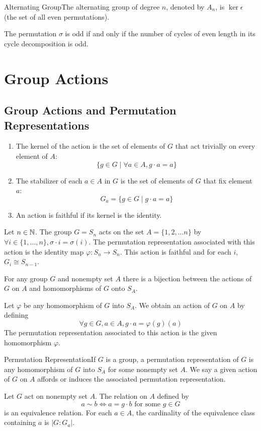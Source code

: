 \documentclass{report}
\newcommand{\mprop}[2]{\begin{Prop}{#1}{}#2\end{Prop}}
\newcommand{\ex}[2]{\begin{Example}{#1}{}#2\end{Example}}
\newcommand{\dfn}[2]{\begin{Definition}[colbacktitle=red!75!black]{#1}{}#2\end{Definition}}
\newenvironment{myproof}[1][\proofname]{%
	\proof[\bfseries #1: ]%
}{\endproof}
\newcommand{\eps}{\epsilon}
\begin{document}
\dfn{Alternating Group}{The alternating group of degree $n$, denoted by $A_n$, is $\ker \eps$ (the set of all even permutations).}
\mprop{}{The permutation $\sigma$ is odd if and only if the number of cycles of even length in its cycle decomposition is odd. }


\chapter{Group Actions}
\section{Group Actions and Permutation Representations}
\dfn{}{\begin{enumerate}
    \item The kernel of the action is the set of elements of $G$ that act trivially on every element of $A$: $$\{g \in G \mid \forall a \in A, g \cdot a = a\}$$
    \item The stabilizer of each $a \in A$ in $G$ is the set of elements of $G$ that fix element $a$:
    $$G_a = \{ g\in G \mid g \cdot a = a \}$$
    \item An action is faithful if its kernel is the identity. 
\end{enumerate}}
\ex{}{Let $n \in \mathbb{N}$. The group $G = S_n$ acts on the set $A = \{1, 2, \dots n\}$ by $\forall i \in \{1, \dots, n \}, \sigma \cdot i = \sigma (i)$. The permutation representation associated with this action is the identity map $\varphi : S_n \to S_n$. This action is faithful and for each $i$, $G_i \cong S_{n-1}$.}
\mprop{}{For any group $G$ and nonempty set $A$ there is a bijection between the actions of $G$ on $A$ and homomorphisms of $G$ onto $S_A$. }
\begin{myproof}
    Let $\varphi$ be any homomorphism of $G$ into $S_A$. We obtain an action of $G$ on $A$ by defining 
    $$\forall g \in G, a \in A, g \cdot a = \varphi (g)(a)$$
    The permutation representation associated to this action is the given homomorphism $\varphi$. 
\end{myproof}
\dfn{Permutation Representation}{If $G$ is a group, a permutation representation of $G$ is any homomorphism of $G$ into $S_A$ for some nonempty set $A$. We say a given action of $G$ on $A$ affords or induces the associated permutation representation.}
\mprop{}{Let $G$ act on nonempty set $A$. The relation on $A$ defined by 
$$a \sim b \iff a = g\cdot b \text{ for some }g \in G$$
is an equivalence relation. For each $a \in A$, the cardinality of the equivalence class containing $a$ is $|G: G_a|$.}
\end{document}
